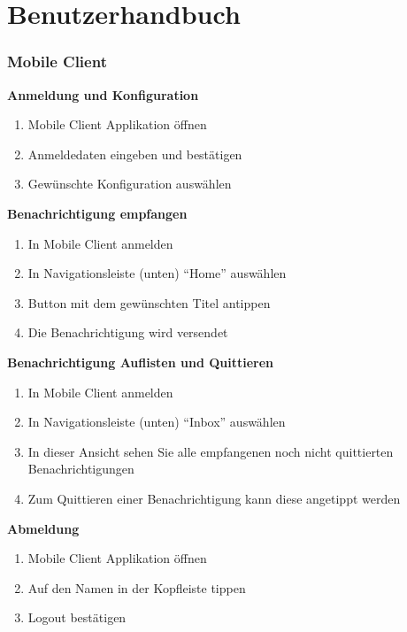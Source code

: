 \section{Benutzerhandbuch}

\subsubsection*{Mobile Client}

\textbf{Anmeldung und Konfiguration}

\begin{enumerate}
    \item Mobile Client Applikation öffnen
    \item Anmeldedaten eingeben und bestätigen
    \item Gewünschte Konfiguration auswählen
\end{enumerate}

\textbf{Benachrichtigung empfangen}

\begin{enumerate}
    \item In Mobile Client anmelden
    \item In Navigationsleiste (unten) ``Home'' auswählen
    \item Button mit dem gewünschten Titel antippen
    \item Die Benachrichtigung wird versendet
\end{enumerate}

\textbf{Benachrichtigung Auflisten und Quittieren}

\begin{enumerate}
    \item In Mobile Client anmelden
    \item In Navigationsleiste (unten) ``Inbox'' auswählen
    \item In dieser Ansicht sehen Sie alle empfangenen noch nicht quittierten Benachrichtigungen
    \item Zum Quittieren einer Benachrichtigung kann diese angetippt werden
\end{enumerate}

\textbf{Abmeldung}

\begin{enumerate}
    \item Mobile Client Applikation öffnen
    \item Auf den Namen in der Kopfleiste tippen
    \item Logout bestätigen
\end{enumerate}

